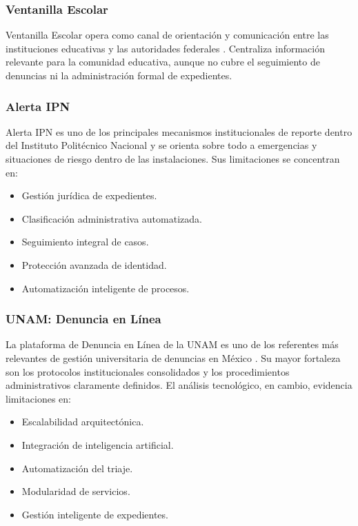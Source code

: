 	\subsubsection{Ventanilla Escolar}
	Ventanilla Escolar opera como canal de orientación y comunicación entre las instituciones educativas
	y las autoridades federales \cite{sep_ventanilla_escolar}. Centraliza información relevante para la
	comunidad educativa, aunque no cubre el seguimiento de denuncias ni la administración formal de
	expedientes.
	
	\subsubsection{Alerta IPN}
	Alerta IPN es uno de los principales mecanismos institucionales de reporte dentro del Instituto
	Politécnico Nacional \cite{ipn_alerta} y se orienta sobre todo a emergencias y situaciones de riesgo
	dentro de las instalaciones. Sus limitaciones se concentran en:
	
	\begin{itemize}
		\item Gestión jurídica de expedientes.
		\item Clasificación administrativa automatizada.
		\item Seguimiento integral de casos.
		\item Protección avanzada de identidad.
		\item Automatización inteligente de procesos.
	\end{itemize}
	
	\subsubsection{UNAM: Denuncia en Línea}
	La plataforma de Denuncia en Línea de la UNAM es uno de los referentes más relevantes de gestión
	universitaria de denuncias en México \cite{unam_ddu_denuncia}. Su mayor fortaleza son los protocolos
	institucionales consolidados y los procedimientos administrativos claramente definidos. El análisis
	tecnológico, en cambio, evidencia limitaciones en:
	
	\begin{itemize}
		\item Escalabilidad arquitectónica.
		\item Integración de inteligencia artificial.
		\item Automatización del triaje.
		\item Modularidad de servicios.
		\item Gestión inteligente de expedientes.
	\end{itemize}
	
